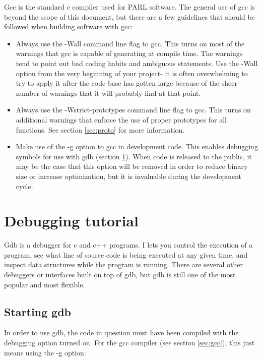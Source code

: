 \documentclass[11pt, letterpaper]{article}
\begin{document}
Gcc is the standard c compiler used for PARL software.  The general use
of gcc is beyond the scope of this document, but there are a few
guidelines that should be followed when building software with gcc:

\begin{itemize}
	\item Always use the -Wall command line flag to gcc.  This turns on
	most of the warnings that gcc is capable of generating at compile
	time.  The warnings tend to point out
	bad coding habits and ambiguous statements.  Use the -Wall option
	from the very beginning of your project- it is often overwhelming to
	try to apply it after the code base has gotten large because of the
	sheer number of warnings that it will probably find at that point.
	\item Always use the -Wstrict-prototypes command line flag to gcc.
	This turns on additional warnings that enforce the use of proper
	prototypes for all functions.  See section \ref{sec:proto} for more
	information.
	\item Make use of the -g option to gcc in development code.  This enables debugging
	symbols for use with gdb (section \ref{sec:gdb}).  When code is
	released to the public, it may be the case that this option will be
	removed in order to reduce binary size or increase optimization, but
	it is invaluable during the development cycle.
\end{itemize}


\section{Debugging tutorial}
\label{sec:gdb}

Gdb is a debugger for c and c++ programs.  I lets you control the
execution of a program, see what line of source code is being executed
at any given time, and inspect data structures while the program is
running.  There are several other debuggers or interfaces built on top
of gdb, but gdb is still one of the most popular and most flexible.

\subsection{Starting gdb}

In order to use gdb, the code in question must have been compiled with
the debugging option turned on.  For the gcc compiler (see section
\ref{sec:gcc}), this just means using the -g option:
\end{document}
